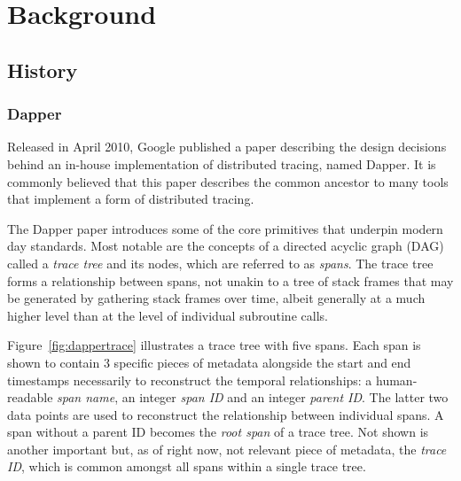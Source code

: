 \documentclass[12pt,pdftex,titlepage]{report}
\begin{document}
    \chapter{Background}
        \section{History}
            \subsection{Dapper}
                Released in April 2010, Google published a paper describing the design decisions behind an in-house implementation 
                of distributed tracing, named Dapper. It is commonly believed that this paper describes the common ancestor to 
                many tools that implement a form of distributed tracing.

                The Dapper paper introduces some of the core primitives that underpin modern day standards. Most notable are the concepts
                of a directed acyclic graph (DAG) called a \textit{trace tree} and its nodes, which are referred to as \textit{spans}. 
                The trace tree forms a relationship between spans, not unakin to a tree of stack frames that may be generated by
                gathering stack frames over time, albeit generally at a much higher level than at the level of individual subroutine calls. 

                Figure~\ref{fig:dappertrace} illustrates a trace tree with five spans. Each span is shown to contain 3 specific pieces of
                metadata alongside the start and end timestamps necessarily to reconstruct the temporal relationships: a human-readable
                \textit{span name}, an integer \textit{span ID} and an integer \textit{parent ID}. The latter two
                data points are used to reconstruct the relationship between individual spans. A span without a parent ID becomes the 
                \textit{root span} of a trace tree. Not shown is another important but, as of right now, not relevant piece of metadata, the 
                \textit{trace ID}, which is common amongst all spans within a single trace tree.
\end{document}
